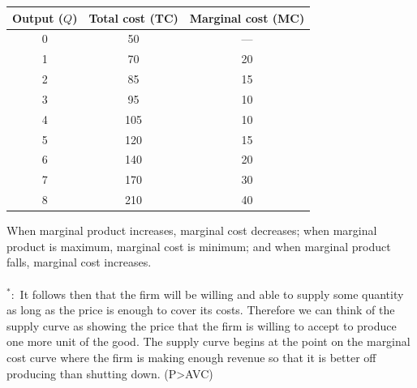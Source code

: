 \begin{center}
\begin{tabular}{ccc}
\toprule
\textbf{Output ($Q$)} & \textbf{Total cost (TC)} & \textbf{Marginal cost (MC)} \\
\midrule
0 & 50 & --- \\
1 & 70 & 20 \\
2 & 85 & 15 \\
3 & 95 & 10 \\
4 & 105 & 10 \\
5 & 120 & 15 \\
6 & 140 & 20 \\
7 & 170 & 30 \\
8 & 210 & 40 \\
\bottomrule
\end{tabular}
\end{center}
When marginal product increases, marginal cost decreases; when marginal product is maximum, marginal cost is minimum; and when marginal product falls, marginal cost increases.
\\\\
$^*:$ It follows then that the firm will be willing and able to supply some quantity as long as the price is enough to cover its costs. Therefore we can think of the supply
curve as showing the price that the firm is willing to accept to produce one more unit of the good. The supply curve begins at the point on the marginal cost curve where the firm is making enough revenue so that it is better off producing than shutting down. (P>AVC)

\begin{center}
\end{center}
